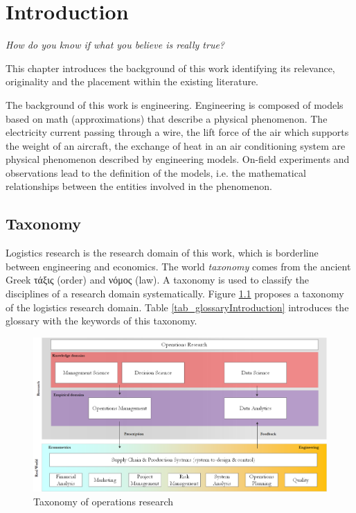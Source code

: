 \chapter{Introduction}

\epigraph{\textit{How do you know if what you believe is really true?}}{}


This chapter introduces the background of this work identifying its relevance, originality and the placement within the existing literature.\par

The background of this work is engineering. Engineering is composed of models based on math (approximations) that describe a physical phenomenon. The electricity current passing through a wire, the lift force of the air which supports the weight of an aircraft, the exchange of heat in an air conditioning system are physical phenomenon described by engineering models. On-field experiments and observations lead to the definition of the models, i.e. the mathematical relationships between the entities involved in the phenomenon.

\section{Taxonomy} \label{secSupplyChainTaxonomy}

Logistics research is the research domain of this work, which is borderline between engineering and economics. The world \textit{taxonomy} comes from the ancient Greek \textgreek{τάξις} (order) and \textgreek{νόμος} (law). A taxonomy is used to classify the disciplines of a research domain systematically. Figure \ref{fig_operationsResearch} proposes a taxonomy of the logistics research domain. Table \ref{tab_glossaryIntroduction} introduces the glossary with the keywords of this taxonomy.

\begin{figure}[hbt!]
\centering
\includegraphics[width=1\textwidth]{SectionIntroduction/introduction_figures/fig_operationsResearch.png}
\captionsetup{type=figure}
\caption{Taxonomy of operations research}
\label{fig_operationsResearch}
\end{figure}


